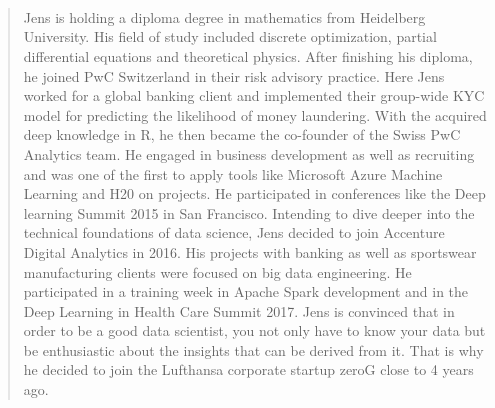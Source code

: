 \documentclass[10pt,a4paper,ragged2e,withhyper]{altacv}
\begin{document}
\begin{paracol}{2}
            \\
            \smallskip
            \\
            \smallskip
            \\
            \smallskip


        \newpage

        \switchcolumn

            \begin{quote}
                Jens is holding a diploma degree in mathematics from Heidelberg University. His field of study included discrete optimization, partial differential equations and theoretical physics. After finishing his diploma, he joined PwC Switzerland in their risk advisory practice. Here Jens worked for a global banking client and implemented their group-wide KYC model for predicting the likelihood of money laundering. With the acquired deep knowledge in R, he then became the co-founder of the Swiss PwC Analytics team. He engaged in business development as well as recruiting and was one of the first to apply tools like Microsoft Azure Machine Learning and H20 on projects. He participated in conferences like the Deep learning Summit 2015 in San Francisco. Intending to dive deeper into the technical foundations of data science, Jens decided to join Accenture Digital Analytics in 2016. His projects with banking as well as sportswear manufacturing clients were focused on big data engineering. He participated in a training week in Apache Spark development and in the Deep Learning in Health Care Summit 2017. Jens is convinced that in order to be a good data scientist, you not only have to know your data but be enthusiastic about the insights that can be derived from it. That is why he decided to join the Lufthansa corporate startup zeroG close to 4 years ago.
            \end{quote}


\end{paracol}
\end{document}
